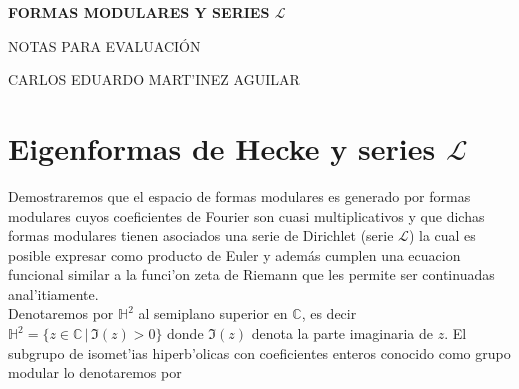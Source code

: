 \documentclass[letterpaper]{report}
\newcommand{\co}{\ensuremath{\mathbb C }}
\newcommand{\hd}{\ensuremath{\mathbb{H}^{2}}}
\begin{document}
\begin{titlepage}
\begin{center}



\LARGE\textbf{FORMAS MODULARES Y SERIES $\mathcal{L}$}
\vspace*{.5cm}

\large NOTAS PARA EVALUACIÓN
\vspace*{2.5cm}


\small CARLOS EDUARDO MART'INEZ AGUILAR




 
\end{center}
\end{titlepage} 

\section{Eigenformas de Hecke y series $\mathcal{L}$}

\noindent Demostraremos que el espacio de formas modulares es generado por formas modulares cuyos coeficientes de Fourier son cuasi multiplicativos y que dichas formas modulares tienen asociados una serie de Dirichlet (serie $\mathcal{L}$) la cual es posible expresar como producto de Euler y además cumplen una ecuacion funcional similar a la funci'on zeta de Riemann que les permite ser continuadas anal'itiamente.\\ 

Denotaremos por $\hd$ al semiplano superior en $\co$, es decir \hbox{$\hd=\lbrace z\in\co\,\vert\,\Im(z)>0\rbrace$} donde $\Im(z)$ denota la parte imaginaria de $z$. El subgrupo de isomet'ias hiperb'olicas con coeficientes enteros conocido como grupo modular lo denotaremos por
\end{document}
